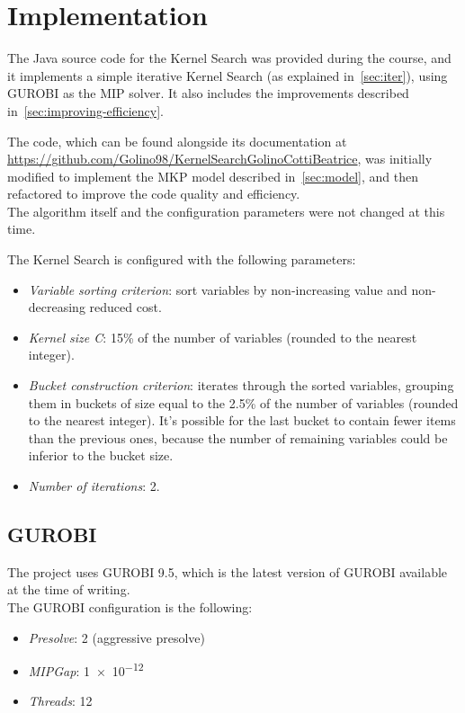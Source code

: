 \chapter{Implementation}\label{ch:implementation}
The Java source code for the Kernel Search was provided during the course,
and it implements a simple iterative Kernel Search (as explained in~\ref{sec:iter}),
using GUROBI as the MIP solver.
It also includes the improvements described in~\ref{sec:improving-efficiency}.

The code, which can be found alongside its documentation at
\url{https://github.com/Golino98/KernelSearchGolinoCottiBeatrice},
was initially modified to implement the MKP model described in~\ref{sec:model},
and then refactored to improve the code quality and efficiency.\\
The algorithm itself and the configuration parameters were not changed at this time.

The Kernel Search is configured with the following parameters:
\begin{itemize}
    \item \textit{Variable sorting criterion}: sort variables by non-increasing value and non-decreasing reduced cost.
    \item \textit{Kernel size C}: 15\% of the number of variables (rounded to the nearest integer).
    \item \textit{Bucket construction criterion}: iterates through the sorted variables, grouping them in
    buckets of size equal to the 2.5\% of the number of variables (rounded to the nearest integer).
    It's possible for the last bucket to contain fewer items than the previous ones, because the number
    of remaining variables could be inferior to the bucket size.
    \item \textit{Number of iterations}: 2.
\end{itemize}


\section{GUROBI}
The project uses GUROBI 9.5, which is the latest version of GUROBI available at the time of writing.\\
The GUROBI configuration is the following:
\begin{itemize}
    \item \textit{Presolve}: 2 (aggressive presolve)
    \item \textit{MIPGap}: \num{1e-12}
    \item \textit{Threads}: 12
\end{itemize}
